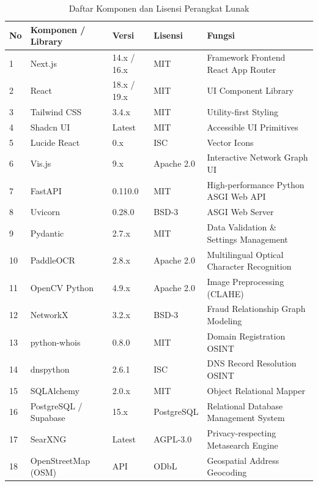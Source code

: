 \documentclass[12pt,a4paper]{article}
\begin{document}
\begin{table}[htbp]
\centering
\small
\caption{Daftar Komponen dan Lisensi Perangkat Lunak}
\begin{tabularx}{\textwidth}{llllX}
\toprule
\textbf{No} & \textbf{Komponen / Library} & \textbf{Versi} & \textbf{Lisensi} & \textbf{Fungsi} \\
\midrule
1 & Next.js & 14.x / 16.x & MIT & Framework Frontend React App Router \\
2 & React & 18.x / 19.x & MIT & UI Component Library \\
3 & Tailwind CSS & 3.4.x & MIT & Utility-first Styling \\
4 & Shadcn UI & Latest & MIT & Accessible UI Primitives \\
5 & Lucide React & 0.x & ISC & Vector Icons \\
6 & Vis.js & 9.x & Apache 2.0 & Interactive Network Graph UI \\
7 & FastAPI & 0.110.0 & MIT & High-performance Python ASGI Web API \\
8 & Uvicorn & 0.28.0 & BSD-3 & ASGI Web Server \\
9 & Pydantic & 2.7.x & MIT & Data Validation \& Settings Management \\
10 & PaddleOCR & 2.8.x & Apache 2.0 & Multilingual Optical Character Recognition \\
11 & OpenCV Python & 4.9.x & Apache 2.0 & Image Preprocessing (CLAHE) \\
12 & NetworkX & 3.2.x & BSD-3 & Fraud Relationship Graph Modeling \\
13 & python-whois & 0.8.0 & MIT & Domain Registration OSINT \\
14 & dnspython & 2.6.1 & ISC & DNS Record Resolution OSINT \\
15 & SQLAlchemy & 2.0.x & MIT & Object Relational Mapper \\
16 & PostgreSQL / Supabase & 15.x & PostgreSQL & Relational Database Management System \\
17 & SearXNG & Latest & AGPL-3.0 & Privacy-respecting Metasearch Engine \\
18 & OpenStreetMap (OSM) & API & ODbL & Geospatial Address Geocoding \\
\bottomrule
\end{tabularx}
\end{table}

\end{document}
